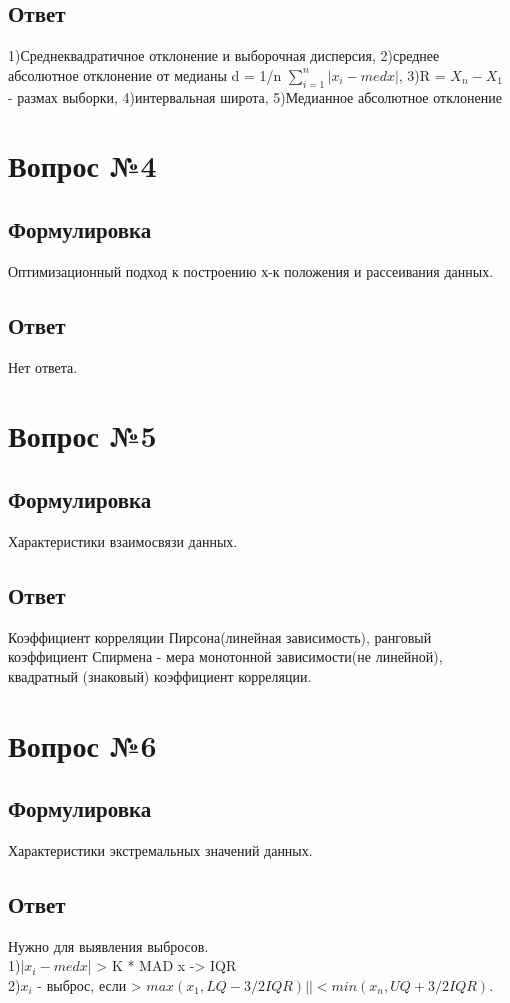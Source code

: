 \documentclass[a4]{article}
\begin{document}
	\subsection*{Ответ}
	1)Среднеквадратичное отклонение и выборочная дисперсия, 2)среднее абсолютное отклонение от медианы d = 1/n $\sum_{i =1}^{n} |x_i - med x|$, 3)R = $X_n - X_1$ - размах выборки, 4)интервальная широта, 5)Медианное абсолютное отклонение
	
	\section{Вопрос №4}
	\subsection*{Формулировка}
	Оптимизационный подход к построению х-к положения и рассеивания данных.
	\subsection*{Ответ}
	Нет ответа.
	
	\section{Вопрос №5}
	\subsection*{Формулировка}
	Характеристики взаимосвязи данных.
	\subsection*{Ответ}
	Коэффициент корреляции Пирсона(линейная зависимость), ранговый коэффициент Спирмена - мера монотонной зависимости(не линейной), квадратный (знаковый) коэффициент корреляции.
	
	\section{Вопрос №6}
	\subsection*{Формулировка}
	Характеристики экстремальных значений данных.
	\subsection*{Ответ}
	Нужно для выявления выбросов.\\
	1)|$x_i - med x$| > K * MAD x -> IQR\\
	2)$x_i$ - выброс, если > $max(x_1, LQ - 3/2 IQR) || < min(x_n, UQ + 3/2 IQR)$.
	
\end{document}
